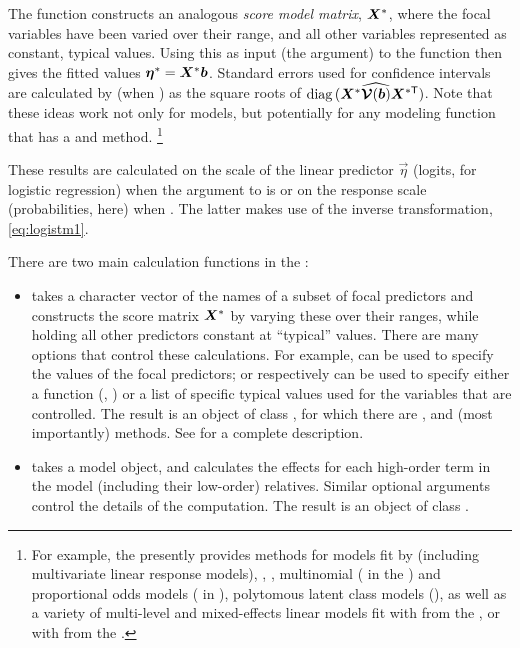 \documentclass[11pt]{book}\usepackage[]{graphicx}\usepackage[]{color}
\begin{document}
The  function constructs an analogous \emph{score model matrix},
$\bm{X}^*$, where the focal variables have been varied over their range,
and all other variables represented as constant, typical values.
Using this as input (the  argument)
to the  function then gives the 
fitted values $\bm{\eta}^* = \bm{X}^* \bm{b}$.
Standard errors used for confidence intervals are calculated by
 (when ) as the square roots of
$\mathrm{diag}\, (\bm{X}^* \widehat{\bm{\mathcal{V}} (\bm{b})} \bm{X}^{*\mathsf{T}} )$.
Note that these ideas work not only for  models, but potentially for
any modeling function that has a  and  method.%
\footnote{
For example, the  presently provides methods for models fit by
 (including multivariate linear response models), ,
, multinomial ( in the )
and proportional odds models ( in ),
polytomous latent class models (), as well as
a variety of multi-level and mixed-effects linear models fit with
 from the , or with  from the .
}

These results are calculated on the scale of the linear predictor $\vec{\eta}$
(logits, for logistic regression) when the  argument to
 is  or on the response scale
(probabilities, here) when .  The latter makes use
of the inverse transformation, \eqref{eq:logistm1}.  

There are two main calculation functions in the :

\begin{itemize}
\item {} takes a character vector of the names of a subset of focal predictors
and constructs the score matrix $\bm{X}^*$ by varying these over their ranges,
while holding all other predictors constant at ``typical'' values.
There are many options that control these calculations. For example,
 can be used to specify the values of the focal predictors; 
 or  respectively can be used to specify either a
function (, ) or a list of specific typical values
used for the variables that are controlled.
The result is an object of class , for which there are ,
 and (most importantly)  methods.  See 
for a complete description.

\item {} takes a model object, and calculates the effects for each
high-order term in the model (including their low-order) relatives.  Similar
optional arguments control the details of the computation. 
The result is an object of class .
\end{itemize}
\end{document}
